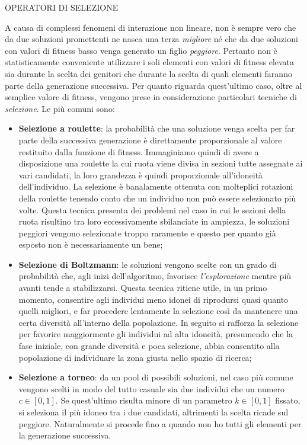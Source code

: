 \documentclass[11pt]{article}
\begin{document}
\vspace{2\baselineskip}
OPERATORI DI SELEZIONE
\vspace{2\baselineskip}

A causa di complessi fenomeni di interazione non lineare, non è sempre vero che da due soluzioni promettenti ne nasca una terza \textit{migliore} né che da due soluzioni con valori di fitness basso venga generato un figlio \textit{peggiore}. Pertanto non è statisticamente conveniente utilizzare i soli elementi con valori di fitness elevata sia durante la scelta dei genitori che durante la scelta di quali elementi faranno parte della generazione successiva. Per quanto riguarda quest'ultimo caso, oltre al semplice valore di fitness, vengono prese in considerazione particolari tecniche di \textit{selezione}. Le più comuni sono:

\begin{itemize}
    \item \textbf{Selezione a roulette}: la probabilità che una soluzione venga scelta per far parte della successiva generazione è direttamente proporzionale al valore restituito dalla funzione di fitness. Immaginiamo quindi di avere a disposizione una roulette la cui ruota viene divisa in sezioni tutte assegnate ai vari candidati, la loro grandezza è quindi proporzionale all'idoneità dell'individuo. La selezione è banalamente ottenuta con molteplici rotazioni della roulette tenendo conto che un individuo non può essere selezionato più volte. Questa tecnica presenta dei problemi nel caso in cui le sezioni della ruota risultino tra loro eccessivamente sbilanciate in ampiezza, le soluzioni peggiori vengono selezionate troppo raramente e questo per quanto già esposto non è necessariamente un bene;

    \item \textbf{Selezione di Boltzmann}: le soluzioni vengono scelte con un grado di probabilità che, agli inizi dell'algoritmo, favorisce \textit{l'esplorazione} mentre più avanti tende a stabilizzarsi. Questa tecnica ritiene utile, in un primo momento, consentire agli individui meno idonei di riprodursi quasi quanto quelli migliori, e far procedere lentamente la selezione così da mantenere una certa diversità all'interno della popolazione. In seguito si rafforza la selezione per favorire maggiormente gli individui ad alta idoneità, presumendo che la fase iniziale, con grande diversità e poca selezione, abbia consentito alla popolazione di individuare la zona giusta nello spazio di ricerca;

    \item \textbf{Selezione a torneo}: da un pool di possibili soluzioni, nel caso più comune vengono scelti in modo del tutto casuale sia due individui che un numero $c \in [0, 1]$. Se quest'ultimo risulta minore di un parametro $k \in [0, 1]$ fissato, si seleziona il più idoneo tra i due candidati, altrimenti la scelta ricade sul peggiore. Naturalmente si procede fino a quando non ho tutti gli elementi per la generazione successiva.
\end{itemize}
\end{document}
